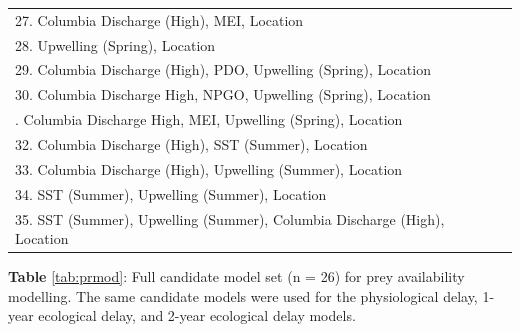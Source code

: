 \documentclass [11pt, proquest] {uwthesis}[2015/03/03]
\begin{document}
\begin{longtable}[t]{l>{}p{7em}>{}p{7em}>{}p{7em}}
27. Columbia Discharge (High), MEI, Location\\
28. Upwelling (Spring), Location\\
29. Columbia Discharge (High), PDO, Upwelling (Spring), Location\\
30. Columbia Discharge High, NPGO, Upwelling (Spring), Location\\
\addlinespace
31. Columbia Discharge High, MEI, Upwelling (Spring), Location\\
32. Columbia Discharge (High), SST (Summer), Location\\
33. Columbia Discharge (High), Upwelling (Summer), Location\\
34. SST (Summer), Upwelling (Summer), Location\\
35. SST (Summer), Upwelling (Summer), Columbia Discharge (High), Location\\
\bottomrule
\end{longtable}
\endgroup{} \clearpage

\textbf{Table} \ref{tab:prmod}: Full candidate model set (n = 26) for
prey availability modelling. The same candidate models were used for the
physiological delay, 1-year ecological delay, and 2-year ecological
delay models.
\end{document}
